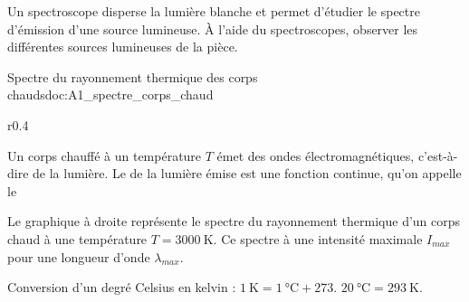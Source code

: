 
\mesure
Un spectroscope disperse la lumière blanche et permet d'étudier le spectre d'émission d'une source lumineuse.
À l'aide du spectroscopes, observer les différentes sources lumineuses de la pièce.


\newpage
\vspace*{-32pt}
\begin{doc}{Spectre du rayonnement thermique des corps chauds}{doc:A1_spectre_corps_chaud}
  \begin{wrapfigure}[5]{r}{0.4\linewidth}
    \vspace*{-22pt}
    \centering
  \end{wrapfigure}
  \phantom{b}\vspace*{-22pt}
  
  \begin{encart}  
    Un corps chauffé à un température $T$ émet des ondes électromagnétiques, c'est-à-dire de la lumière.
    Le  de la lumière émise est une fonction continue, qu'on appelle le 
  \end{encart}

  Le graphique à droite représente le spectre du rayonnement thermique d'un corps chaud à une température $T = \qty{3000}{\kelvin}$.
  Ce spectre à une intensité maximale $I_{max}$ pour une longueur d'onde $\lambda_{max}$.
  \smallskip

  \begin{encart}
    Conversion d'un degré Celsius en kelvin :
    $\qty{1}{\kelvin} = \qty{1}{\degreeCelsius} + 273$. 
    \exemple $\qty{20}{\degreeCelsius} = \qty{293}{\kelvin}$.
  \end{encart}
\end{doc}



